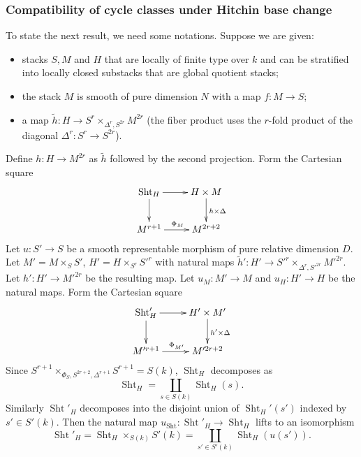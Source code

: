\documentclass[reqno]{amsart}
\numberwithin{equation}{section}
\newcommand{\wt}[1]{\widetilde{#1}}
\newcommand{\co}{\colon}
\DeclareMathOperator{\Sht}{Sht}
\newcommand\D\Delta
\theoremstyle{remark}
\numberwithin{equation}{section}
\begin{document}
\subsubsection{Compatibility of cycle classes under Hitchin base change} To state the next result, we need some notations. Suppose we are given:
\begin{itemize}
\item stacks $S,M$ and $H$ that are locally of finite type over $k$ and can be stratified  into locally closed substacks that are global quotient stacks;
\item the stack $M$ is smooth of pure dimension $N$ with a map $f:M\to S$;
\item a map $\wt h: H  \to S^r \times_{\D^r, S^{2r}}M^{2r}$ (the fiber product uses the $r$-fold product of the diagonal  $\D^{r}: S^r \to S^{2r}$). 
\end{itemize}
Define $h \co H  \rightarrow M^{2r}$ as $\wt{h}$ followed by the second projection. Form the Cartesian square
\begin{equation}\label{ShtH}
\xymatrix{\Sht_{H}\ar[d]\ar[r] &  H \times M \ar[d]^{h \times \Delta}\\
M^{r+1}\ar[r]^{\Phi_{M}} & M^{2r+2}}
\end{equation}
Let $u: S'\to S$ be a smooth representable morphism of pure relative dimension $D$. Let $M'=M\times_{S}S'$, $H'=H\times_{S^{r}}S'^{r}$ with natural maps $\wt h': H'\to S'^{r}\times_{\D^{r}, S'^{2r}}M'^{2r}$. Let $h':H'\to M'^{2r}$ be the resulting map. Let $u_{M}: M'\to M$ and $u_{H}: H'\to H$ be the natural maps. Form the Cartesian square
\begin{equation}\label{Sht'H}
\xymatrix{\Sht'_{H}\ar[d]\ar[r] &  H'\ar[d]^{ h' \times \Delta} \times M' \\
M'^{r+1}\ar[r]^{\Phi_{M'}} & M'^{2r+2}}
\end{equation}
Since $S^{r+1}\times_{\Phi_{S}, S^{2r+2}, \D^{r+1}}S^{r+1}=S(k)$,  $\Sht_{H}$ decomposes as 
\begin{equation}
\Sht_{H}=\coprod_{s\in S(k)}\Sht_{H}(s).
\end{equation}
Similarly $\Sht'_{H}$ decomposes into the disjoint union of $\Sht_{H}'(s')$ indexed by $s'\in S'(k)$.
Then the natural map $u_{\Sht}: \Sht'_{H}\to \Sht_{H}$ lifts to an isomorphism
\begin{equation}
\Sht'_{H}=\Sht_{H}\times_{S(k)}S'(k)=\coprod_{s'\in S'(k)}\Sht_{H}(u(s')).
\end{equation}
\end{document}
